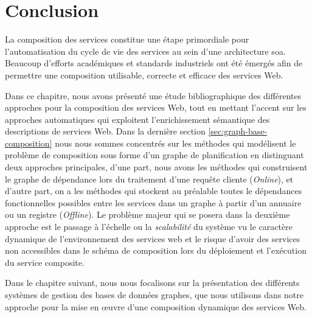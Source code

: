 \section*{Conclusion}
\label{sec:conclusion}
 

La composition des services constitue une étape primordiale pour
l'automatisation du cycle de vie des services au sein d'une
architecture \acrshort{soa}. Beaucoup d'efforts académiques et
standards industriels ont été émergés afin de permettre une
composition utilisable, correcte et efficace des services Web.\medskip

Dans ce chapitre, nous avons présenté une étude bibliographique des
différentes approches pour la composition des services Web, tout en
mettant l'accent sur les approches automatiques qui exploitent
l'enrichissement sémantique des descriptions de services Web. Dans la
dernière section \ref{sec:graph-base-composition} nous nous sommes
concentrés sur les méthodes qui modélisent le problème de composition
sous forme d'un graphe de planification en distinguant deux approches
principales, d'une part, nous avons les méthodes qui construisent le
graphe de dépendance lors du traitement d'une requête cliente
(\textit{Online}), et d'autre part, on a les méthodes qui stockent au
préalable toutes le dépendances fonctionnelles possibles entre les
services dans un graphe à partir d'un annuaire ou un registre
(\textit{Offline}). Le problème majeur qui se posera dans la deuxième
approche est le passage à l'échelle ou la \textit{scalabilité} du
système vu le caractère dynamique de l'environnement des services web
et le risque d'avoir des services non accessibles dans le schéma de
composition lors du déploiement et l'exécution du service
composite.\medskip

Dans le chapitre suivant, nous nous focalisons sur la présentation des
différents systèmes de gestion des bases de données graphes, que nous
utilisons dans notre approche pour la mise en œuvre d'une composition
dynamique des services Web.

